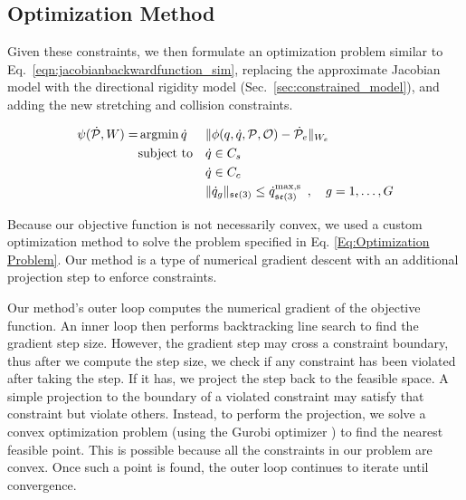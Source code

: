 \subsection{Optimization Method}

Given these constraints, we then formulate an optimization problem similar to Eq.~\eqref{eqn:jacobianbackwardfunction_sim}, replacing the approximate Jacobian model with the directional rigidity model (Sec.~\ref{sec:constrained_model}), and adding the new stretching and collision constraints.


\begin{equation}
\begin{aligned}
    \psi(\dot{\mathcal{P}}, W) = 
        & \operatorname*{argmin}{\dot{q}}
            & & \| \phi(q, \dot{q}, \mathcal{P}, \mathcal{O}) - \dot{\mathcal{P}}_e \|_{W_e} \\
        & \textrm{subject to}
            & & \dot{q} \in C_s\\
        &   & & \dot{q} \in C_c\\
        &   & & \| \dot{q}_g \|_{\mathfrak{se}(3)} \leq \dot{q}^\textrm{max,s}_{\mathfrak{se}(3)} \enspace, \quad g = 1, \dots, G
\end{aligned}
\label{Eq:Optimization Problem}
\end{equation}

Because our objective function is not necessarily convex, we used a custom optimization method to solve the problem specified in Eq. \ref{Eq:Optimization Problem}. Our method is a type of numerical gradient descent with an additional projection step to enforce constraints.

Our method's outer loop computes the numerical gradient of the objective function. An inner loop then performs backtracking line search to find the gradient step size. However, the gradient step may cross a constraint boundary, thus after we compute the step size, we check if any constraint has been violated after taking the step. If it has, we project the step back to the feasible space. A simple projection to the boundary of a violated constraint may satisfy that constraint but violate others. Instead, to perform the projection, we solve a convex optimization problem (using the Gurobi optimizer \cite{Gurobi2016}) to find the nearest feasible point. This is possible because all the constraints in our problem are convex. Once such a point is found, the outer loop continues to iterate until convergence.

